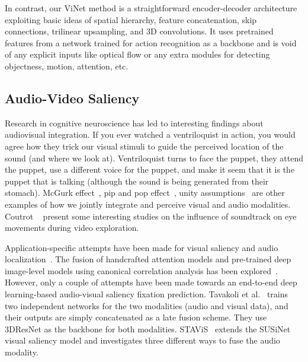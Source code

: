 \documentclass[letterpaper, 10 pt, conference]{ieeeconf}  \usepackage{times}
\begin{document}
In contrast, our ViNet method is a straightforward encoder-decoder architecture exploiting basic ideas of spatial hierarchy, feature concatenation, skip connections, trilinear upsampling, and 3D convolutions. It uses pretrained features from a network trained for action recognition as a backbone and is void of any explicit inputs like optical flow or any extra modules for detecting objectness, motion, attention, etc. 



















\subsection{Audio-Video Saliency}

Research in cognitive neuroscience has led to interesting findings about audiovisual integration. If you ever watched a ventriloquist in action, you would agree how they trick our visual stimuli to guide the perceived location of the sound (and where we look at). Ventriloquist turns to face the puppet, they attend the puppet, use a different voice for the puppet, and make it seem that it is the puppet that is talking (although the sound is being generated from their stomach). McGurk effect~\cite{mcgurk1976hearing}, pip and pop effect~\cite{van2008pip}, unity assumptions~\cite{vatakis2007crossmodal} are other examples of how we jointly integrate and perceive visual and audio modalities. Coutrot \etal~\cite{coutrot2012influence, coutrot2014saliency, coutrot2016multimodal} present some interesting studies on the influence of soundtrack on eye movements during video exploration.  





Application-specific attempts have been made for visual saliency and audio localization~\cite{ruesch2008multimodal,schauerte2011multimodal,chen2014audio}. The fusion of handcrafted attention models and pre-trained deep image-level models using canonical correlation analysis has been explored~\cite{min2016fixation,min2020multimodal}. However, only a couple of attempts have been made towards an end-to-end deep learning-based audio-visual saliency fixation prediction. Tavakoli et al.~\cite{tavakoli2019dave} trains two independent networks for the two modalities (audio and visual data), and their outputs are simply concatenated as a late fusion scheme. They use 3DResNet as the backbone for both modalities. STAViS~\cite{tsiami2020stavis} extends the SUSiNet~\cite{koutras2019susinet} visual saliency model and investigates three different ways to fuse the audio modality.  
\end{document}
